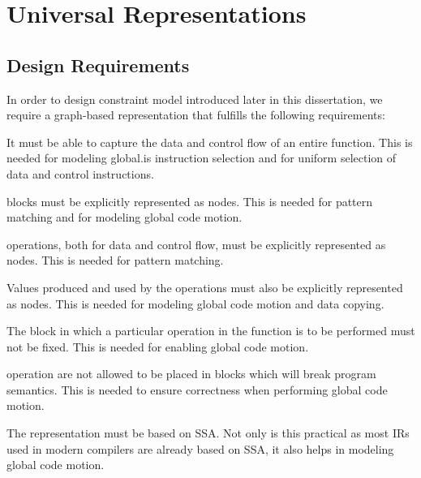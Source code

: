 %

\chapter{Universal Representations}




\section{Design Requirements}

In order to design \gls{constraint model} introduced later in this dissertation,
we require a \gls{graph}-based representation that fulfills the following
requirements:
%
\begin{requirements}
  \item {}
    It must be able to capture the data and control flow of an entire
    \gls{function}.
    This is needed for modeling \gls{global.is} \gls{instruction selection}
    and for uniform selection of data and control \glspl{instruction}.
  \item {}
    \Glspl{block} must be explicitly represented as \glspl{node}.
    This is needed for \gls{pattern matching} and for modeling \gls{global code
      motion}.
  \item {}
    \Glspl{operation}, both for data and control flow, must be explicitly
    represented as \glspl{node}.
    This is needed for \gls{pattern matching}.
  \item {}
    Values produced and used by the \glspl{operation} must also be explicitly
    represented as \glspl{node}.
    This is needed for modeling \gls{global code motion} and \gls{data copying}.
  \item {}
    The \gls{block} in which a particular \gls{operation} in the \gls{function}
    is to be performed must not be fixed.
    This is needed for enabling \gls{global code motion}.
  \item {}
    \Gls{operation} are not allowed to be placed in \glspl{block} which will
    break \gls{program} semantics.
    This is needed to ensure correctness when performing \gls{global code
      motion}.
  \item {}
    The representation must be based on \gls{SSA}.
    Not only is this practical as most \glspl{IR} used in modern
    \glspl{compiler} are already based on \gls{SSA}, it also helps in modeling
    \gls{global code motion}.
\end{requirements}

